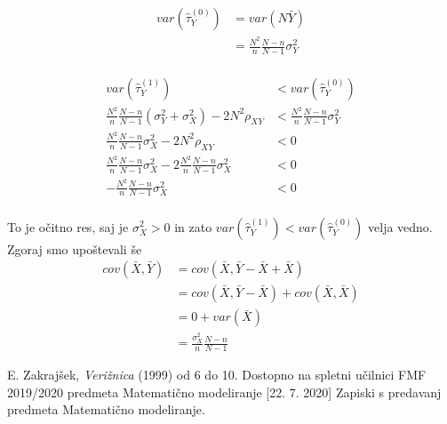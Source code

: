 \documentclass[A4paper, 11pt]{article}
\begin{document}
\[
\begin{split}
var(\hat{\tau}_Y ^ {(0)}) & = var(N \bar{Y}) \\
                                          & = \frac{N^2}{n} \frac{N - n}{N - 1} \sigma_Y^2
\end{split}
\]
\\
\[
\begin{split}
var(\hat{\tau}_Y ^ {(1)}) & < var(\hat{\tau}_Y ^ {(0)}) \\
 \frac{N^2}{n} \frac{N - n}{N - 1} (\sigma_Y^2 + \sigma_X^2) - 2 N^2 \rho_{XY} & < \frac{N^2}{n} \frac{N - n}{N - 1} \sigma_Y^2 \\
 \frac{N^2}{n} \frac{N - n}{N - 1} \sigma_X^2 - 2 N^2 \rho_{XY} & < 0 \\
 \frac{N^2}{n} \frac{N - n}{N - 1} \sigma_X^2 - 2 \frac{N^2}{n} \frac{N - n}{N - 1} \sigma_X^2 & < 0 \\
 - \frac{N^2}{n} \frac{N - n}{N - 1} \sigma_X^2  & < 0 \\
\end{split}
\]

To je očitno res, saj je $\sigma_X^2 > 0$ in zato $var(\hat{\tau}_Y ^ {(1)}) < var(\hat{\tau}_Y ^ {(0)}) $ velja vedno.
Zgoraj smo upoštevali še
\[
\begin{split}
cov(\bar{X}, \bar{Y}) & = cov(\bar{X}, \bar{Y} - \bar{X} + \bar{X}) \\
                                   & = cov(\bar{X}, \bar{Y} - \bar{X}) + cov(\bar{X}, \bar{X}) \\
                                   & = 0 + var(\bar{X}) \\
                                   & = \frac{\sigma_X^2}{n} \frac{N - n}{N - 1}
\end{split}
\]




\begin{thebibliography}{9}
	E. Zakrajšek, \emph{Verižnica} (1999) od 6 do 10.
	Dostopno na spletni učilnici FMF 2019/2020 predmeta Matematično modeliranje [22. 7. 2020]
	Zapiski s predavanj predmeta Matematično modeliranje.
\end{thebibliography}
\end{document}
